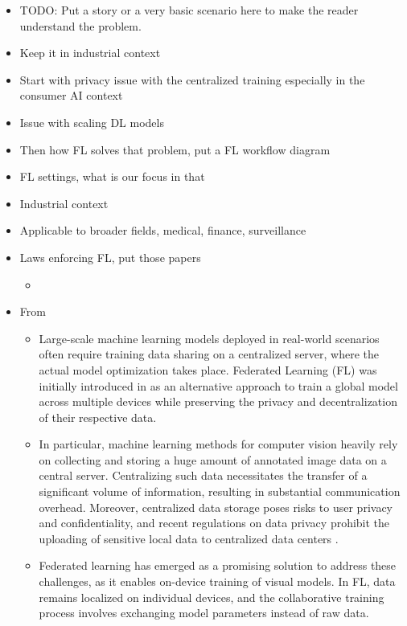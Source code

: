 \documentclass[thesis]{mas_proposal}
\begin{document}
\begin{itemize}
      \item TODO: Put a story or a very basic scenario here to make the reader understand the problem.
      \item Keep it in industrial context
      \item Start with privacy issue with the centralized training especially in the consumer AI context
      \item Issue with scaling DL models
      \item Then how FL solves that problem, put a FL workflow diagram
      \item FL settings, what is our focus in that
      \item Industrial context
      \item Applicable to broader fields, medical, finance, surveillance
      \item Laws enforcing FL, put those papers
            \begin{itemize}
                  \item \cite{voigt2017eu}
            \end{itemize}
      \item From \cite{shenaj2023federated}
      \begin{itemize}
            \item Large-scale machine learning models deployed in real-world scenarios often require training data sharing on a centralized server, where the actual model optimization takes place. Federated Learning (FL) was initially introduced in \cite{mcmahan2017communication} as an alternative approach to train a global model across multiple devices while preserving the privacy and decentralization of their respective data. \cite{shenaj2023federated}
            \item In particular, machine learning methods for computer vision heavily rely on collecting and storing a huge amount of annotated image data on a central server. Centralizing such data necessitates the transfer of a significant volume of information, resulting in substantial communication overhead. Moreover, centralized data storage poses risks to user privacy and confidentiality, and recent regulations on data privacy prohibit the uploading of sensitive local data to centralized data centers \cite{voigt2017eu}.
            \item Federated learning has emerged as a promising solution to address these challenges, as it enables on-device training of visual models. In FL, data remains localized on individual devices, and the collaborative training process involves exchanging model parameters instead of raw data.
      \end{itemize}

\end{itemize}
\end{document}
